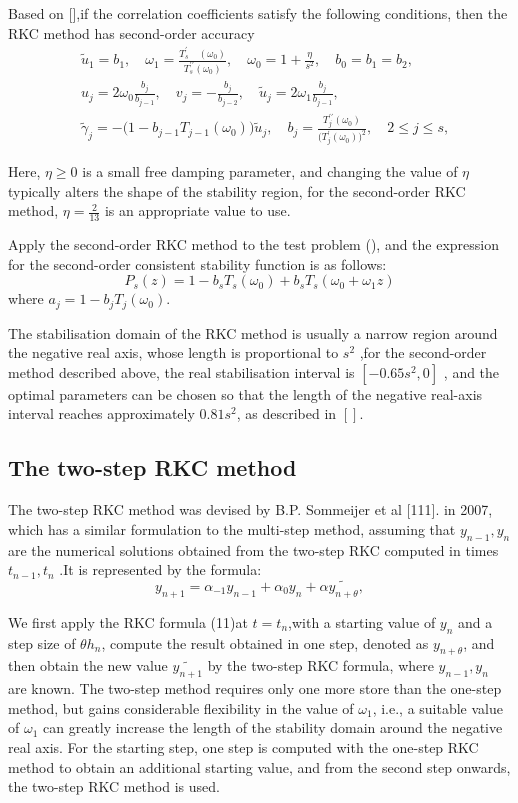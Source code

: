 \documentclass[review]{elsarticle}
\begin{document}
Based on [],if the correlation coefficients satisfy the following conditions, 
then the RKC method has second-order accuracy
\begin{align}
    &\tilde{u}_{1} =b_{1} ,\quad \omega_{1}=\frac{T_{s}^{\prime}\quad(\omega_{0})}{T_{s}^{\prime\prime}(\omega_{0})}, \quad  \omega_{0}=1+\frac{\eta}{s^{2}}, \quad b_{0}=b_{1}=b_{2},\nonumber  \\
    &u_{j} =2\omega_{0}\frac{b_{j}}{b_{j-1}},\quad v_{j}=-\frac{b_{j}}{b_{j-2}},\quad\tilde{u}_{j}=2\omega_{1}\frac{b_{j}}{b_{j-1}}, \nonumber \\
    &\tilde{\gamma}_{j} =-\big(1-b_{j-1}T_{j-1}(\omega_{0})\big)\tilde{u}_{j},\quad b_{j}=\frac{T_{j}^{\prime\prime}(\omega_{0})}{\big(T_{j}^{\prime}(\omega_{0})\big)^{2}},\quad2\leq j\leq s, \nonumber
\end{align}

Here, $\eta \geq 0$ is a small free damping parameter, and changing the value of $\eta$ typically alters the shape of the stability region,
for the second-order RKC method, $\eta = \frac{2}{13}$ is an appropriate value to use.

Apply the second-order RKC method to the test problem (), and the expression for the second-order consistent stability function is as follows:
$$
P_s(z)=1-b_sT_s(\omega_0)+b_sT_s(\omega_0+\omega_1z)
$$
where $a_{j}=1-b_{j}T_{j}(\omega_{0}).$

The stabilisation domain of the RKC method is usually a narrow region around the negative real axis, whose length is proportional to $s^2$
,for the second-order method described above, the real stabilisation interval is $[-0.65s^2,0]$ , and the optimal parameters can be chosen so that the length of the negative real-axis interval reaches approximately $0.81s^2$, as described in $[]$.

\subsection{The two-step RKC method}

The two-step RKC method was devised by B.P. Sommeijer et al [111]. in 2007, which has a similar formulation to the multi-step method, assuming that $y_{n-1},y_{n}$ are the numerical solutions obtained from the two-step RKC computed in times $t_{n-1},t_{n}$
.It is represented by the formula:
$$
y_{n+1}=\alpha_{-1}y_{n-1}+\alpha_{0}y_{n}+\alpha\tilde{y_{n+\theta}},
$$

We first apply the RKC formula (11)at $t=t_{n}$,with a starting value of $y_{n}$ and a step size of $\theta h_n$, compute the result obtained in one step, denoted as $y_{n+\theta}$,
and then obtain the new value $\tilde{y_{n+1}}$ by the two-step RKC formula, where $y_{n-1},y_{n}$ are known. The two-step method requires only one more store than the one-step method, 
but gains considerable flexibility in the value of $\omega_{1}$, i.e., a suitable value of $\omega_{1}$ can greatly increase the length of the stability domain around the negative real axis.
For the starting step, one step is computed with the one-step RKC method to obtain an additional starting value, and from the second step onwards, the two-step RKC method is used.
\end{document}
